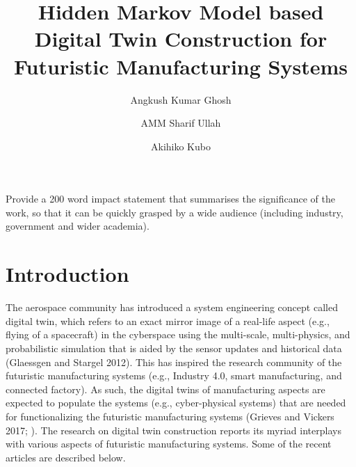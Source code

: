 \documentclass{CUP-JNL-DCE}
\begin{document}
\begin{Frontmatter}

\title[Constructing Digital Twins for Manufacturing]
{Hidden Markov Model based Digital Twin Construction for Futuristic Manufacturing Systems}

\author[1]{Angkush Kumar Ghosh}
\author*[2]{AMM Sharif Ullah}
\author[2]{Akihiko Kubo}


\address[1]{, , }

\address*[2]{, , }




\begin{policy}
Provide a 200 word impact statement that summarises the significance of the work, so that it can be quickly grasped by a wide audience (including industry, government and wider academia).
\end{policy}

\end{Frontmatter}


\section{Introduction}
\label{sec1}

The aerospace community has introduced a system engineering concept called
digital twin, which refers to an exact mirror image of a real-life aspect
(e.g., flying of a spacecraft) in the cyberspace using the multi-scale,
multi-physics, and probabilistic simulation that is aided by the sensor
updates and historical data (Glaessgen and Stargel 2012). This has inspired
the research community of the futuristic manufacturing systems (e.g.,
Industry 4.0, smart manufacturing, and connected factory). As such, the
digital twins of manufacturing aspects are expected to populate the systems
(e.g., cyber-physical systems) that are needed for functionalizing the
futuristic manufacturing systems (Grieves and Vickers 2017; \citealt{Ullah2019}).
The research on digital twin construction reports its myriad interplays with
various aspects of futuristic manufacturing systems. Some of the recent
articles are described below.
\end{document}
